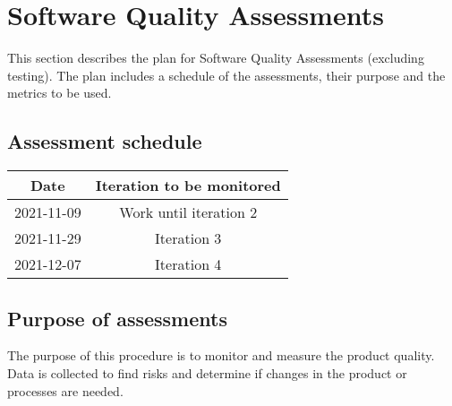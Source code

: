 \section{Software Quality Assessments}
This section describes the plan for Software Quality Assessments (excluding testing). The plan includes a schedule of the assessments, their purpose and the metrics to be used.



\subsection{Assessment schedule}
\begin{table}[H]
\centering
\begin{tabular}{||c c||} 
\hline
Date & Iteration to be monitored \\ [0.5ex] 
\hline\hline
2021-11-09 & Work until iteration 2 \\
\hline
2021-11-29 & Iteration 3 \\
\hline
2021-12-07 & Iteration 4 \\
\hline
\end{tabular}
\end{table}

\subsection{Purpose of assessments}
The purpose of this procedure is to monitor and measure the product quality. Data is collected to find risks and determine if changes in the product or processes are needed.

